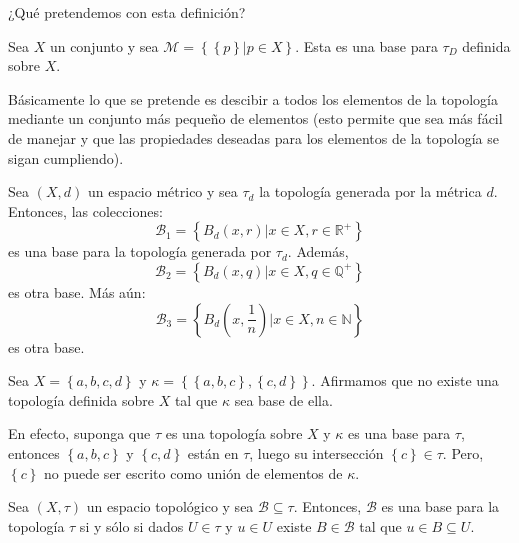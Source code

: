 \documentclass[12pt]{report}
\theoremstyle{largebreak}
\begin{document}
    ¿Qué pretendemos con esta definición?

    \begin{exa}
        Sea $X$ un conjunto y sea $\mathcal{M}=\left\{\left\{p\right\}\big| p\in X \right\}$. Esta es una base para $\tau_D$ definida sobre $X$.
    \end{exa}

    Básicamente lo que se pretende es descibir a todos los elementos de la topología mediante un conjunto más pequeño de elementos (esto permite que sea más fácil de manejar y que las propiedades deseadas para los elementos de la topología se sigan cumpliendo).

    \begin{exa}
        Sea $(X,d)$ un espacio métrico y sea $\tau_d$ la topología generada por la métrica $d$. Entonces, las colecciones:
        \begin{equation*}
            \mathcal{B}_1 =\left\{B_d(x,r)\big| x\in X, r\in\mathbb{R}^+ \right\}
        \end{equation*}
        es una base para la topología generada por $\tau_d$. Además,
        \begin{equation*}
            \mathcal{B}_2=\left\{B_d(x,q)\big| x\in X, q\in\mathbb{Q}^+ \right\}
        \end{equation*}
        es otra base. Más aún:
        \begin{equation*}
            \mathcal{B}_3=\left\{B_d\left(x,\frac{1}{n}\right) \big| x\in X, n\in\mathbb{N} \right\}
        \end{equation*}
        es otra base.
    \end{exa}

    \begin{exa}
        Sea $X=\left\{a,b,c,d\right\}$ y $\kappa=\left\{\left\{a,b,c\right\}, \left\{c,d\right\} \right\}$. Afirmamos que no existe una topología definida sobre $X$ tal que $\kappa$ sea base de ella.

        En efecto, suponga que $\tau$ es una topología sobre $X$ y $\kappa$ es una base para $\tau$, entonces $\left\{a,b,c\right\}$ y $\left\{c,d\right\}$ están en $\tau$, luego su intersección $\left\{c\right\}\in\tau$. Pero, $\left\{c\right\}$ no puede ser escrito como unión de elementos de $\kappa$.
    \end{exa}

    \begin{propo}
        Sea $(X,\tau)$ un espacio topológico y sea $\mathcal{B}\subseteq\tau$. Entonces, $\mathcal{B}$ es una base para la topología $\tau$ si y sólo si dados $U\in \tau$ y $u\in U$ existe $B\in\mathcal{B}$ tal que $u\in B\subseteq U$.
    \end{propo}
\end{document}

